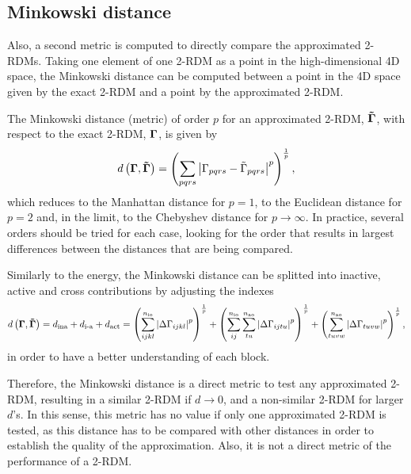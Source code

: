 \subsection{Minkowski distance}
Also, a second metric is computed to directly compare the approximated 2-RDMs.
Taking one element of one 2-RDM as a point in the high-dimensional 4D space,
the Minkowski distance can be computed between a point in the 4D space given by the
exact 2-RDM and a point by the approximated 2-RDM.

The Minkowski distance (metric) of order $p$ for an approximated 2-RDM,
$ \boldsymbol{\mathrm{\tilde{\Gamma}}}$, with respect to the exact 2-RDM, $ \boldsymbol{\mathrm{\Gamma}}$,
is given by 
\begin{equation} \label{eq:minkowski-distance}
    d \left( \boldsymbol{\mathrm{\Gamma}} , \boldsymbol{\mathrm{\tilde{\Gamma}}} \right) =
    \left(
        \sum_{pqrs} \left| \Gamma_{pqrs} - \tilde{\Gamma}_{pqrs} \right|^p
    \right)^{\frac{1}{p}}
    ,
\end{equation}
which reduces to the Manhattan distance for $p=1$, to the Euclidean distance
for $p=2$ and, in the limit, to the Chebyshev distance for $p \to \infty$.
In practice, several orders should be tried for each case, looking for the
order that results in largest differences between the distances that are
being compared.

Similarly to the energy, the Minkowski distance can be splitted into
inactive, active and cross contributions by adjusting the indexes 
\begin{equation}
    d \left( \boldsymbol{\mathrm{\Gamma}} , \boldsymbol{\mathrm{\tilde{\Gamma}}} \right) =
    d_{\text{ina}} + d_{\text{i-a}} + d_{\text{act}} =
    \left(
        \sum_{ijkl}^{n_{\text{io}}} \left| \Delta \Gamma_{ijkl} \right|^p
    \right)^{\frac{1}{p}}
    +
    \left(
        \sum_{ij}^{n_{\text{io}}} \sum_{tu}^{n_{\text{ao}}} \left| \Delta \Gamma_{ijtu} \right|^p
    \right)^{\frac{1}{p}}
    +
    \left(
        \sum_{tuvw}^{n_{\text{ao}}} \left| \Delta \Gamma_{tuvw} \right|^p
    \right)^{\frac{1}{p}}
    ,
\end{equation}
in order to have a better understanding of each block.

Therefore, the Minkowski distance is a direct metric to test any approximated
2-RDM, resulting in a similar 2-RDM if $d \to 0$, and a non-similar 2-RDM
for larger $d$'s.
In this sense, this metric has no value if only one approximated 2-RDM is tested,
as this distance has to be compared with other distances in order to establish
the quality of the approximation.
Also, it is not a direct metric of the performance of a 2-RDM.
